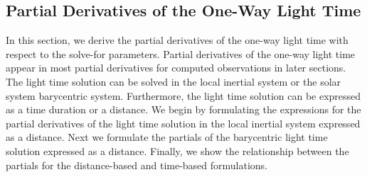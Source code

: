 \subsection{Partial Derivatives of the One-Way Light Time} \label{Sec:OneWayLightTimePartials}

In this section, we derive the partial derivatives of the one-way light time with respect to the solve-for parameters. Partial derivatives of the one-way light time appear in most partial derivatives for computed observations in later sections.  The light time solution can be solved in the local inertial system or the solar system barycentric system.  Furthermore, the light time solution can be expressed as a time duration or a distance.  We begin by formulating the expressions for the partial derivatives of the light time solution in the local inertial system expressed as a distance. Next we formulate the partials of the barycentric light time solution expressed as a distance.  Finally, we show the relationship between the partials for the distance-based and time-based formulations.

